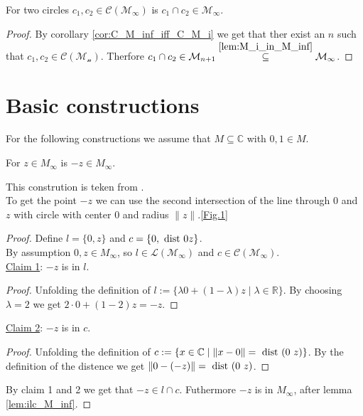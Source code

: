 \begin{lemma}
    \label{lem:icc_M_inf}
    \leanok
    For two circles $c_1, c_2 \in \mathcal{C(M_{\infty})}$ is $c_1 \cap c_2 \in \mathcal{M}_{\infty}$.
\end{lemma}
\begin{proof}
    By corollary \ref{cor:C_M_inf_iff_C_M_i} we get that ther exist an $n$ such that $c_1, c_2 \in \mathcal{C(M_n)}$.
    Therfore $c_1 \cap c_2 \in \mathcal{M}_{n+1} \stackrel{\ref{lem:M_i_in_M_inf}}{\subseteq} \mathcal{M}_{\infty}$.
\end{proof}


\section{Basic constructions}\label{basic_constructions}
For the following constructions we assume that $M\subseteq \mathbb{C}$ with $0,1 \in M$.

\begin{lemma}
    \label{lem:construction_neg}
    \leanok
    For $z \in M_{\infty}$ is $-z \in M_{\infty}$.
\end{lemma}
This constrution is teken from \cite{JAN_SCHRÖER:2023}.\\
To get the point $-z$ we can use the second intersection of the line through $0$ and $z$ with circle with center $0$ and radius $\|z\|$.\ref{Fig.1}

\begin{proof}
    Define $l = \{0,z\}$ and $c = \{0,\text{ dist } 0 z\}$.\\
    By assumption $0, z \in M_{\infty}$, so $l \in \mathcal{L(M_{\infty})}$ and $c \in \mathcal{C(M_{\infty})}$.\\
    \underline{Claim 1}: $-z$ is in $l$.
    \begin{proof}
        Unfolding the definition of $l:=\{\lambda 0+(1-\lambda)z\mid\lambda\in\mathbb{R}\}$.
        By choosing $\lambda = 2$ we get $2 \cdot 0 + (1-2)z = -z$.
    \end{proof}
    \underline{Claim 2}: $-z$ is in $c$.
    \begin{proof}
        Unfolding the definition of $c:=\{x\in\mathbb{C} \mid\|x-0\|=\dist (0\ z)\}$.
        By the definition of the distence we get $\|0-(-z)\| = \text{ dist } (0\ z)$.
    \end{proof}
    By claim 1 and 2 we get that $-z \in l \cap c$. Futhermore  $-z $ is in $M_{\infty}$, after lemma \ref{lem:ilc_M_inf}.
\end{proof}


